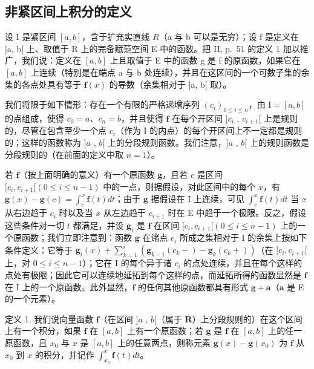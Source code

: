 \subsection{非紧区间上积分的定义}

设 I 是紧区间 \([a, b]\)，含于扩充实直线 \(\overline{R}\)（a 与 b 可以是无穷）；设 f 是定义在 {]}a, b{[} 上、取值于 R 上的完备赋范空间 E 中的函数。把 II, p.~51 的定义 1 加以推广，我们说：定义在 \([a, b]\) 上且取值于 E 中的函数 g 是 f 的原函数，如果它在 \([a, b]\) 上连续（特别是在端点 a 与 b 处连续），并且在这区间的一个可数子集的余集的各点处具有等于 \(\mathbf{f}(x)\) 的导数（余集相对于 {]}a, b{[} 取）。

我们将限于如下情形：存在一个有限的严格递增序列 \((c_i)_{0\leqslant i\leqslant n}\)，由 \(\mathrm{I} = [a,b]\) 的点组成，使得 \(c_0 = a\)、\(c_n = b\)，并且使得 \(\mathbf{f}\) 在每个开区间 \(]c_i\) , \(c_{i + 1}[\) 上是规则的，尽管在包含至少一个点 \(c_i\)（作为 \(\mathrm{I}\) 的内点）的每个开区间上不一定都是规则的；这样的函数称为 \(]a\) , \(b[\) 上的分段规则函数。我们注意，\(]a\) , \(b[\) 上的规则函数是分段规则的（在前面的定义中取 \(n = 1\)）。

若 \(\mathbf{f}\)（按上面明确的意义）有一个原函数 \(\mathbf{g}\)，且若 \(c\) 是区间 \([c_i, c_{i+1}[(0 \leqslant i \leqslant n-1)\) 中的一点，则据假设，对此区间中的每个 \(x\)，有 \(\mathbf{g}(x) - \mathbf{g}(c) = \int_c^x \mathbf{f}(t) dt\)；由于 \(\mathbf{g}\) 据假设在 I 上连续，可见 \(\int_c^x \mathbf{f}(t) dt\) 当 \(x\) 从右边趋于 \(c_i\) 时以及当 \(x\) 从左边趋于 \(c_{i+1}\) 时在 E 中趋于一个极限。反之，假设这些条件对一切 \(t\) 都满足，并设 \(\mathbf{g}_i\) 是 \(\mathbf{f}\) 在区间 \([c_i, c_{i+1}[(0 \leqslant i \leqslant n-1)\) 上的一个原函数；我们立即注意到：函数 \(\mathbf{g}\) 在诸点 \(c_i\) 所成之集相对于 I 的余集上按如下条件定义：它等于 \(\mathbf{g}_i(x) + \sum_{k=1}^i (\mathbf{g}_{k-1}(c_k-) - \mathbf{g}_k(c_k+))\)（在 \([c_i, c_{i+1}[\) 上，对 \(0 \leqslant i \leqslant n-1\)）；它在 I 的每个异于诸 \(c_i\) 的点处连续，并且在每个这样的点处有极限；因此它可以连续地延拓到每个这样的点，而延拓所得的函数显然是 \(\mathbf{f}\) 在 I 上的一个原函数。此外显然，\(\mathbf{f}\) 的任何其他原函数都具有形式 \(\mathbf{g} + \mathbf{a}\)（\(\mathbf{a}\) 是 E 的一个元素）。

定义 1. 我们说向量函数 \(\mathbf{f}\)（在区间 \(]a\) , \(b[\)（属于 \(\overline{\mathbf{R}}\)）上分段规则的）在这个区间上有一个积分，如果 \(\mathbf{f}\) 在 \([a, b]\) 上有一个原函数；若 \(\mathbf{g}\) 是 \(\mathbf{f}\) 在 \([a, b]\) 上的任一原函数，且 \(x_0\) 与 \(x\) 是 \([a, b]\) 上的任意两点，则称元素 \(\mathbf{g}(x) - \mathbf{g}(x_0)\) 为 \(\mathbf{f}\) 从 \(x_0\) 到 \(x\) 的积分，并记作 \(\int_{x_0}^x \mathbf{f}(t) dt\)。

